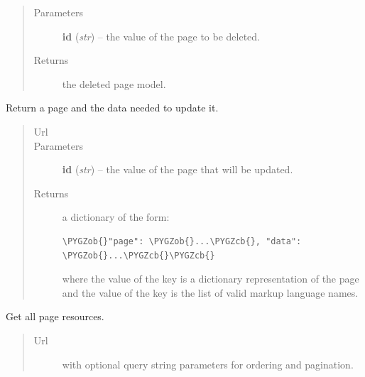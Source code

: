 \documentclass[letterpaper,10pt,english]{sphinxmanual}
\def\PYGZob{\char`\{}
\def\PYGZcb{\char`\}}
\begin{document}
\begin{fulllineitems}
\begin{fulllineitems}
\begin{quote}
\begin{description}
\item[{Parameters}] \leavevmode
\textbf{id} (\emph{str}) -- the  value of the page to be deleted.

\item[{Returns}] \leavevmode
the deleted page model.

\end{description}\end{quote}

\end{fulllineitems}


\begin{fulllineitems}
\label{api:onlinelinguisticdatabase.controllers.pages.PagesController.edit}
Return a page and the data needed to update it.
\begin{quote}\begin{description}
\item[{Url }] \leavevmode
{}

\item[{Parameters}] \leavevmode
\textbf{id} (\emph{str}) -- the  value of the page that will be updated.

\item[{Returns}] \leavevmode

a dictionary of the form:

\begin{Verbatim}[commandchars=\\\{\}]
\PYGZob{}"page": \PYGZob{}...\PYGZcb{}, "data": \PYGZob{}...\PYGZcb{}\PYGZcb{}
\end{Verbatim}

where the value of the  key is a dictionary
representation of the page and the value of the  key
is the list of valid markup language names.


\end{description}\end{quote}

\end{fulllineitems}


\begin{fulllineitems}
\label{api:onlinelinguisticdatabase.controllers.pages.PagesController.index}
Get all page resources.
\begin{quote}\begin{description}
\item[{Url }] \leavevmode
{} with optional query string parameters for ordering
and pagination.


\end{description}
\end{quote}
\end{fulllineitems}
\end{fulllineitems}
\end{document}
